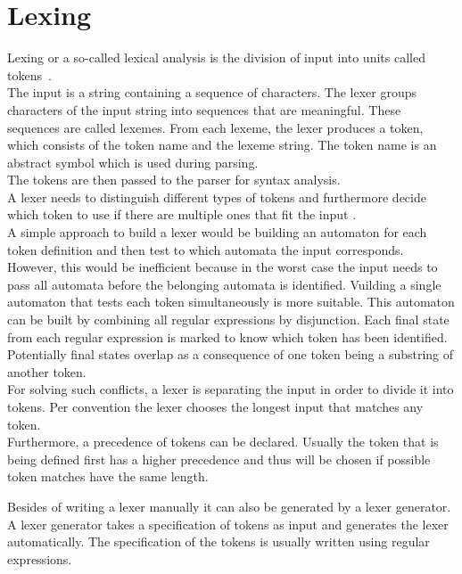 \section{Lexing}\label{sec:BackgroundLexer}

Lexing or a so-called lexical analysis is the division of input into units called tokens~\cite{LexYacc.1992}.\\
The input is a string containing a sequence of characters.
The lexer groups characters of the input string into sequences that are meaningful. These sequences are called lexemes. From each lexeme, the lexer produces a token, which consists of the token name and the lexeme string. The token name is an abstract symbol which is used during parsing. \cite{Aho.2007} \\
The tokens are then passed to the parser for syntax analysis.\\
A lexer needs to distinguish different types of tokens and furthermore decide which token to use if there are multiple ones that fit the input \cite{Mogensen.2017}.\\
A simple approach to build a lexer would be building an automaton for each token definition and then test to which automata the input corresponds.\\
However, this would be inefficient because in the worst case the input needs to pass all automata before the belonging automata is identified.
Vuilding a single automaton that tests each token simultaneously is more suitable.
This automaton can be built by combining all regular expressions by disjunction.
Each final state from each regular expression is marked to know which token has been identified.\\
Potentially final states overlap as a consequence of one token being a substring of another token. \\
For solving such conflicts, a lexer is separating the input in order to divide it into tokens.
Per convention the lexer chooses the longest input that matches any token.~\cite{Mogensen.2017} \\
Furthermore, a precedence of tokens can be declared. Usually the token that is being defined first has a higher precedence and thus will be chosen if possible token matches have the same length. \cite{Mogensen.2017}

Besides of writing a lexer manually it can also be generated by a lexer generator.
A lexer generator takes a specification of tokens as input and generates the lexer automatically. 
The specification of the tokens is usually written using regular expressions. 


